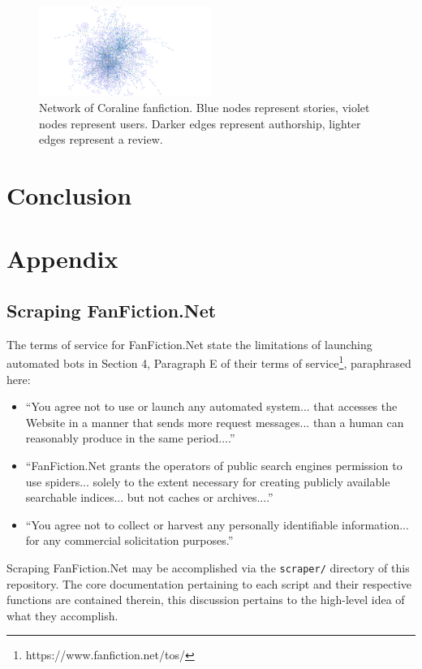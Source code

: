 \documentclass[letterpaper]{article}
\begin{document}
\begin{figure}
    \centering
    \includegraphics[width=0.5\textwidth]{Coraline_network.png}
    \caption{Network of Coraline fanfiction. Blue nodes represent stories, violet nodes represent users. Darker edges represent authorship, lighter edges represent a review.}
    \label{fig:my_label}
\end{figure}

\section{Conclusion}

\section{Appendix}

\subsection{Scraping FanFiction.Net}

The terms of service for FanFiction.Net state the limitations of launching automated bots in Section 4, Paragraph E of their terms of service\footnote{https://www.fanfiction.net/tos/}, paraphrased here:

\begin{itemize}
    \item ``You agree not to use or launch any automated system... that accesses the Website in a manner that sends more request messages... than a human can reasonably produce in the same period....''
    \item ``FanFiction.Net grants the operators of public search engines permission to use spiders... solely to the extent necessary for creating publicly available searchable indices... but not caches or archives....''
    \item ``You agree not to collect or harvest any personally identifiable information... for any commercial solicitation purposes.''
\end{itemize}

Scraping FanFiction.Net may be accomplished via the \texttt{scraper/} directory of this repository. The core documentation pertaining to each script and their respective functions are contained therein, this discussion pertains to the high-level idea of what they accomplish.
\end{document}
